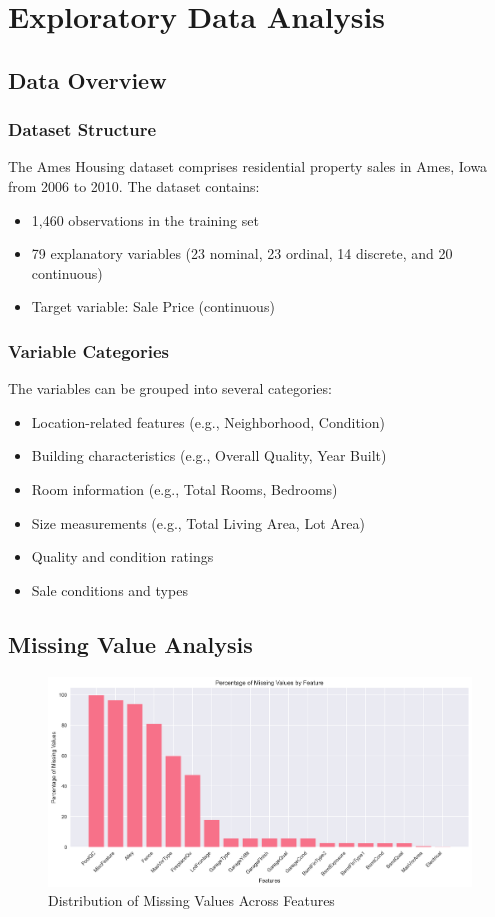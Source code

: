 \chapter{Exploratory Data Analysis}

\section{Data Overview}
\subsection{Dataset Structure}
The Ames Housing dataset comprises residential property sales in Ames, Iowa from 2006 to 2010. The dataset contains:
\begin{itemize}
    \item 1,460 observations in the training set
    \item 79 explanatory variables (23 nominal, 23 ordinal, 14 discrete, and 20 continuous)
    \item Target variable: Sale Price (continuous)
\end{itemize}

\subsection{Variable Categories}
The variables can be grouped into several categories:
\begin{itemize}
    \item Location-related features (e.g., Neighborhood, Condition)
    \item Building characteristics (e.g., Overall Quality, Year Built)
    \item Room information (e.g., Total Rooms, Bedrooms)
    \item Size measurements (e.g., Total Living Area, Lot Area)
    \item Quality and condition ratings
    \item Sale conditions and types
\end{itemize}

\section{Missing Value Analysis}
\begin{figure}[H]
    \centering
    \includegraphics[width=1.0\textwidth]{figures/missing_values.png}
    \caption{Distribution of Missing Values Across Features}
    \label{fig:missing_values}
\end{figure}

